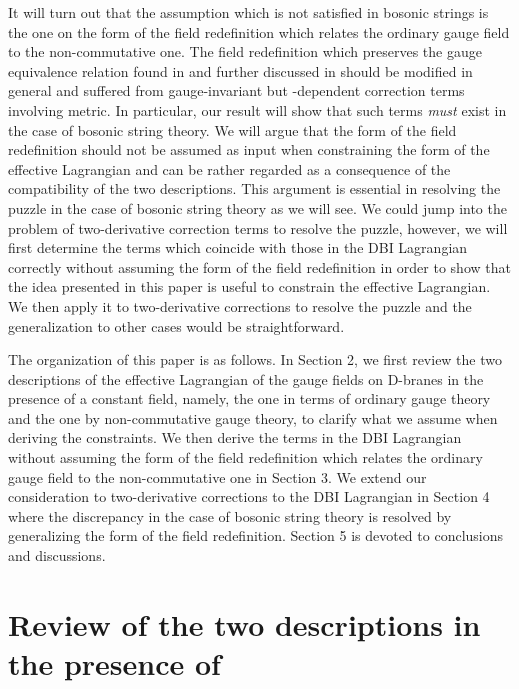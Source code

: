 \documentclass[a4paper,12pt]{article}
\begin{document}
It will turn out that
the assumption which is not satisfied in bosonic strings
is the one on the form of the field redefinition
which relates the ordinary gauge field
to the non-commutative one.
The field redefinition
which preserves the gauge equivalence relation
found in \cite{SW} and further discussed in \cite{AK}
should be modified in general
and suffered from gauge-invariant
but \coordHE{}-dependent correction terms
involving metric.
In particular, our result will show that
such terms {\it must} exist in the case of bosonic string theory.
We will argue that the form of the field redefinition
should not be assumed as input when constraining
the form of the effective Lagrangian
and can be rather regarded as a consequence of the compatibility
of the two descriptions.
This argument is essential in resolving the puzzle
in the case of bosonic string theory as we will see.
We could jump into the problem of
two-derivative correction terms
to resolve the puzzle, however,
we will first determine the \coordHE{} terms which 
coincide with those in the DBI Lagrangian correctly
without assuming the form of the field redefinition
in order to show that the idea presented in this paper is 
useful to constrain the effective Lagrangian.
We then apply it to two-derivative corrections
to resolve the puzzle
and the generalization to other cases would be straightforward.

The organization of this paper is as follows.
In Section 2, we first review the two descriptions of
the effective Lagrangian of the gauge fields on D-branes
in the presence of a constant \coordHE{} field, namely,
the one in terms of ordinary gauge theory
and the one by non-commutative gauge theory,
to clarify what we assume when deriving the constraints.
We then derive the \coordHE{} terms in the DBI Lagrangian
without assuming the form of the field redefinition
which relates the ordinary gauge field to the non-commutative one
in Section 3.
We extend our consideration to two-derivative corrections
to the DBI Lagrangian in Section 4
where the discrepancy in the case of bosonic string theory
is resolved by generalizing the form of the field redefinition.
Section 5 is devoted to conclusions and discussions.

\section{Review of the two descriptions in the presence of \coordHE{}}
\setcounter{equation}{0}
\indent
\end{document}

